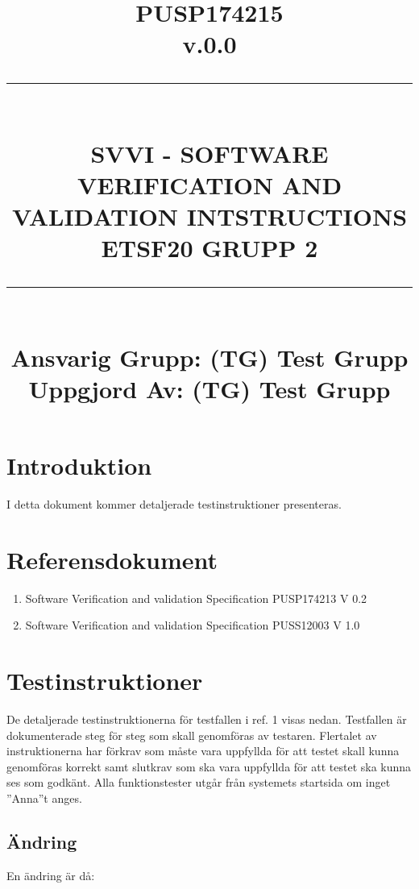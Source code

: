 \documentclass[paper=a4, fontsize=11pt,twoside]{article}
\title{
		\documentNumber{#1}																						
		\documentVersion{#2}																				
		\HRule{0.5pt} \\ %
		\LARGE \textbf{\uppercase{#3}} \\
		\large \textbf{\uppercase{ETSF20 Grupp 2}} 
		\HRule{2pt} \\ [1.5cm]    
		\normalsize            
		\documentResponsible{#4} \\ 
		\documentCreator{#4}  
	}
\newcommand{\HRule}[1]{\rule{\linewidth}{#1}}
\newcommand{\documentNumber}[1]{\centering PUSP1742#1 \\[1.0cm]}
\newcommand{\documentVersion}[1]{\centering \small{v.#1} \\[1.0cm]}
\newcommand{\documentResponsible}[1]{\centering  Ansvarig Grupp: #1}
\newcommand{\documentCreator}[1]{\centering Uppgjord Av: #1}
\newcommand{\grouptitlepage}[4]{ 
	\title{
		\documentNumber{#1}																						
		\documentVersion{#2}																				
		\HRule{0.5pt} \\ %
		\LARGE \textbf{\uppercase{#3}} \\
		\large \textbf{\uppercase{ETSF20 Grupp 2}} 
		\HRule{2pt} \\ [1.5cm]    
		\normalsize            
		\documentResponsible{#4} \\ 
		\documentCreator{#4}  
	}																							
	\maketitle																							
	\thispagestyle{empty} 																					
	\newpage 
}
\begin{document}
\grouptitlepage
{15}
{0.0}
{SVVI - Software Verification and Validation Intstructions}
{(TG) Test Grupp}
\tableofcontents
\section{Introduktion}

I detta dokument kommer detaljerade testinstruktioner presenteras.

\section{Referensdokument}

\begin{enumerate}
\item Software Verification and validation Specification PUSP174213 V 0.2
\item Software Verification and validation Specification PUSS12003 V 1.0
\end{enumerate}

\section{Testinstruktioner}

De detaljerade testinstruktionerna för testfallen i ref. 1 visas nedan.
Testfallen är dokumenterade steg för steg som skall genomföras av testaren. 
Flertalet av instruktionerna har förkrav som måste vara uppfyllda för att testet
skall kunna genomföras korrekt samt slutkrav som ska vara uppfyllda för att
testet ska kunna ses som godkänt. Alla funktionstester utgår från systemets
startsida om inget ”Anna”t anges.



 \subsection {Ändring}
En ändring är då:
\end{document}
